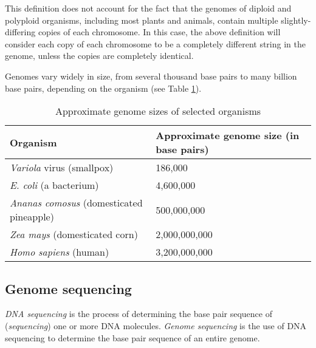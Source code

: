 \documentclass[10pt]{article}
\begin{document}
This definition does not account for the fact that the genomes of diploid and
polyploid organisms, including most plants and animals, contain multiple
slightly-differing copies of each chromosome.  In this case, the above
definition will consider each copy of each chromosome to be a completely
different string in the genome, unless the copies are completely identical.

Genomes vary widely in size, from several thousand base pairs to many billion
base pairs, depending on the organism (see Table \ref{tab:GenomeSizes}).

\begin{table}[H]
	\begin{center}
		\begin{tabular}{|l|p{4.5cm}|}
			\hline
			{\bf Organism} & {\bf Approximate genome size (in base
			pairs)} \\
			\hline
			{\it Variola} virus (smallpox) &  186,000 \\
			\hline
			{\it E. coli} (a bacterium) & 4,600,000 \\
			\hline
			{\it Ananas comosus} (domesticated pineapple) & 500,000,000 \\
			\hline
			{\it Zea mays} (domesticated corn) & 2,000,000,000 \\
			\hline
			{\it Homo sapiens} (human)       &  3,200,000,000 \\
			\hline
		\end{tabular}
	\end{center}
	\caption{Approximate genome sizes of selected organisms}
	\label{tab:GenomeSizes}
\end{table}

\subsection{Genome sequencing}

{\it DNA sequencing} is the process of determining the base pair sequence of
({\it sequencing}) one or more DNA molecules.  {\it Genome sequencing} is the use
of DNA sequencing to determine the base pair sequence of an entire genome.
\end{document}
